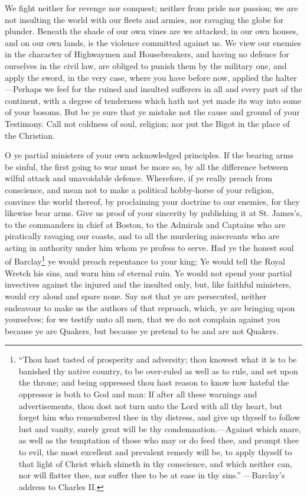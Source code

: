 \documentclass[12pt,oneside]{memoir}
\begin{document}
We fight neither for revenge nor conquest; neither from pride nor
passion; we are not insulting the world with our fleets and armies,
nor ravaging the globe for plunder. Beneath the shade of our own
vines are we attacked; in our own houses, and on our own lands, is
the violence committed against us. We view our enemies in the
character of Highwaymen and Housebreakers, and having no defence for
ourselves in the civil law, are obliged to punish them by the
military one, and apply the sword, in the very case, where you have
before now, applied the halter---Perhaps we feel for the ruined and
insulted sufferers in all and every part of the continent, with a
degree of tenderness which hath not yet made its way into some of
your bosoms. But be ye sure that ye mistake not the cause and ground
of your Testimony. Call not coldness of soul, religion; nor put the
Bigot in the place of the Christian.

O ye partial ministers of your own acknowledged principles. If the
bearing arms be sinful, the first going to war must be more so, by
all the difference between wilful attack and unavoidable defence.
Wherefore, if ye really preach from conscience, and mean not to make
a political hobby-horse of your religion, convince the world thereof,
by proclaiming your doctrine to our enemies, for they likewise bear
arms. Give us proof of your sincerity by publishing it at St.
James's, to the commanders in chief at Boston, to the Admirals and
Captains who are piratically ravaging our coasts, and to all the
murdering miscreants who are acting in authority under him whom ye
profess to serve. Had ye the honest soul of Barclay\footnote{``Thou hast tasted of prosperity and adversity; thou knowest what it
is to be banished thy native country, to be over-ruled as well as to
rule, and set upon the throne; and being oppressed thou hast reason
to know how hateful the oppressor is both to God and man: If after
all these warnings and advertisements, thou dost not turn unto the
Lord with all thy heart, but forget him who remembered thee in thy
distress, and give up thyself to follow lust and vanity, surely
great will be thy condemnation.---Against which snare, as well as the
temptation of those who may or do feed thee, and prompt thee to evil,
the most excellent and prevalent remedy will be, to apply thyself to
that light of Christ which shineth in thy conscience, and which
neither can, nor will flatter thee, nor suffer thee to be at ease in
thy sins.'' ---Barclay's address to Charles II.} ye would
preach repentance to your king; Ye would tell the Royal Wretch his
sins, and warn him of eternal ruin. Ye would not spend your partial
invectives against the injured and the insulted only, but, like
faithful ministers, would cry aloud and spare none. Say not that ye
are persecuted, neither endeavour to make us the authors of that
reproach, which, ye are bringing upon yourselves; for we testify
unto all men, that we do not complain against you because ye are
Quakers, but because ye pretend to be and are not Quakers.
\end{document}

